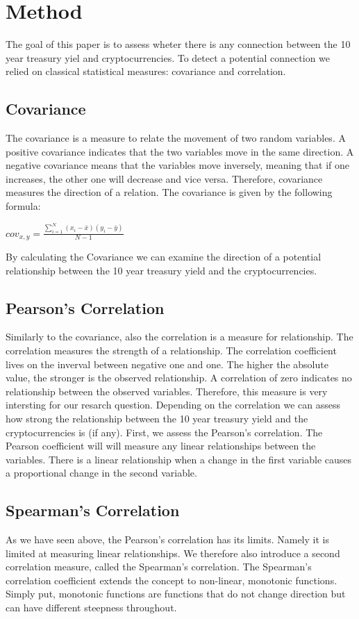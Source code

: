 \documentclass[11pt]{article}
\begin{document}
\section{Method}
The goal of this paper is to assess wheter there is any connection between the 10 year treasury yiel and cryptocurrencies. To detect a potential connection we relied on classical statistical measures: covariance and correlation.

\subsection{Covariance}
The covariance is a measure to relate the movement of two random variables. A positive covariance indicates that the two variables move in the same direction. A negative covariance means that the variables move inversely, meaning that if one increases, the other one will decrease and vice versa. Therefore, covariance measures the direction of a relation. The covariance is given by the following formula:
\begin{center}
   \large $cov_{x,y}=\frac{\sum_{i=1}^{N}(x_{i}-\bar{x})(y_{i}-\bar{y})}{N-1}$
\end{center}
By calculating the Covariance we can examine the direction of a potential relationship between the 10 year treasury yield and the cryptocurrencies.

\subsection{Pearson's Correlation}
Similarly to the covariance, also the correlation is a measure for relationship. The correlation measures the strength of a relationship. The correlation coefficient lives on the inverval between negative one and one. The higher the absolute value, the stronger is the observed relationship. A correlation of zero indicates no relationship between the observed variables. Therefore, this measure is very intersting for our resarch question. Depending on the correlation we can assess how strong the relationship between the 10 year treasury yield and the cryptocurrencies is (if any).
First, we assess the Pearson's correlation. The Pearson coefficient will will measure any linear relationships between the variables. There is a linear relationship when a change in the first variable causes a proportional change in the second variable.


\subsection{Spearman's Correlation}
As we have seen above, the Pearson's correlation has its limits. Namely it is limited at measuring linear relationships. We therefore also introduce a second correlation measure, called the Spearman's correlation. The Spearman’s correlation coefficient extends the concept to non-linear, monotonic functions. Simply put, monotonic functions are functions that do not change direction but can have different steepness throughout. 
\end{document}
